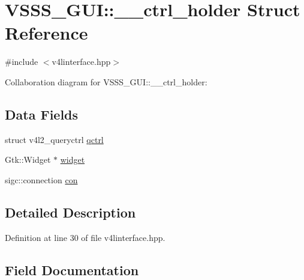 \hypertarget{struct_v_s_s_s___g_u_i_1_1____ctrl__holder}{}\section{V\+S\+S\+S\+\_\+\+G\+UI\+:\+:\+\_\+\+\_\+ctrl\+\_\+holder Struct Reference}
\label{struct_v_s_s_s___g_u_i_1_1____ctrl__holder}


{\ttfamily \#include $<$v4linterface.\+hpp$>$}



Collaboration diagram for V\+S\+S\+S\+\_\+\+G\+UI\+:\+:\+\_\+\+\_\+ctrl\+\_\+holder\+:
\subsection*{Data Fields}
\begin{DoxyCompactItemize}
\item 
struct v4l2\+\_\+queryctrl \hyperlink{struct_v_s_s_s___g_u_i_1_1____ctrl__holder_ab215a49cfe0350894f78df2243fd0148}{qctrl}
\item 
Gtk\+::\+Widget $\ast$ \hyperlink{struct_v_s_s_s___g_u_i_1_1____ctrl__holder_a520db763fb25758f6f39e833a4e99c4b}{widget}
\item 
sigc\+::connection \hyperlink{struct_v_s_s_s___g_u_i_1_1____ctrl__holder_ac682559b2a4e5a07ace0b61be5841c0a}{con}
\end{DoxyCompactItemize}


\subsection{Detailed Description}


Definition at line 30 of file v4linterface.\+hpp.



\subsection{Field Documentation}
\mbox{\label{struct_v_s_s_s___g_u_i_1_1____ctrl__holder_ac682559b2a4e5a07ace0b61be5841c0a}} 

